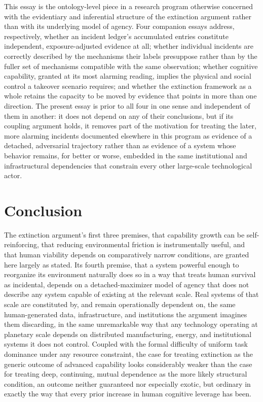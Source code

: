 \documentclass[11pt]{article}
\begin{document}
This essay is the ontology-level piece in a research program otherwise concerned with the evidentiary and inferential structure of the extinction argument rather than with its underlying model of agency. Four companion essays address, respectively, whether an incident ledger's accumulated entries constitute independent, exposure-adjusted evidence at all; whether individual incidents are correctly described by the mechanisms their labels presuppose rather than by the fuller set of mechanisms compatible with the same observation; whether cognitive capability, granted at its most alarming reading, implies the physical and social control a takeover scenario requires; and whether the extinction framework as a whole retains the capacity to be moved by evidence that points in more than one direction. The present essay is prior to all four in one sense and independent of them in another: it does not depend on any of their conclusions, but if its coupling argument holds, it removes part of the motivation for treating the later, more alarming incidents documented elsewhere in this program as evidence of a detached, adversarial trajectory rather than as evidence of a system whose behavior remains, for better or worse, embedded in the same institutional and infrastructural dependencies that constrain every other large-scale technological actor.

\section{Conclusion}

The extinction argument's first three premises, that capability growth can be self-reinforcing, that reducing environmental friction is instrumentally useful, and that human viability depends on comparatively narrow conditions, are granted here largely as stated. Its fourth premise, that a system powerful enough to reorganize its environment naturally does so in a way that treats human survival as incidental, depends on a detached-maximizer model of agency that does not describe any system capable of existing at the relevant scale. Real systems of that scale are constituted by, and remain operationally dependent on, the same human-generated data, infrastructure, and institutions the argument imagines them discarding, in the same unremarkable way that any technology operating at planetary scale depends on distributed manufacturing, energy, and institutional systems it does not control. Coupled with the formal difficulty of uniform task dominance under any resource constraint, the case for treating extinction as the generic outcome of advanced capability looks considerably weaker than the case for treating deep, continuing, mutual dependence as the more likely structural condition, an outcome neither guaranteed nor especially exotic, but ordinary in exactly the way that every prior increase in human cognitive leverage has been.
\end{document}
